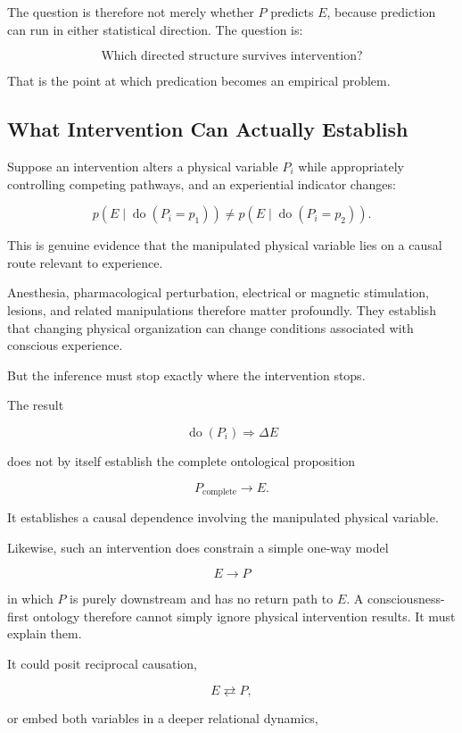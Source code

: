 The question is therefore not merely whether $P$ predicts $E$, because prediction can run in either statistical direction. The question is:

\[
\boxed{
\text{Which directed structure survives intervention?}
}
\]

That is the point at which predication becomes an empirical problem.

\subsection{What Intervention Can Actually Establish}

Suppose an intervention alters a physical variable $P_i$ while appropriately controlling competing pathways, and an experiential indicator changes:

\[
p(E\mid \operatorname{do}(P_i=p_1))
\neq
p(E\mid \operatorname{do}(P_i=p_2)).
\]

This is genuine evidence that the manipulated physical variable lies on a causal route relevant to experience.

Anesthesia, pharmacological perturbation, electrical or magnetic stimulation, lesions, and related manipulations therefore matter profoundly. They establish that changing physical organization can change conditions associated with conscious experience.

But the inference must stop exactly where the intervention stops.

The result

\[
\operatorname{do}(P_i)\Rightarrow \Delta E
\]

does not by itself establish the complete ontological proposition

\[
P_{\mathrm{complete}}\longrightarrow E.
\]

It establishes a causal dependence involving the manipulated physical variable.

Likewise, such an intervention does constrain a simple one-way model

\[
E\longrightarrow P
\]

in which $P$ is purely downstream and has no return path to $E$. A consciousness-first ontology therefore cannot simply ignore physical intervention results. It must explain them.

It could posit reciprocal causation,

\[
E\rightleftarrows P,
\]

or embed both variables in a deeper relational dynamics,

